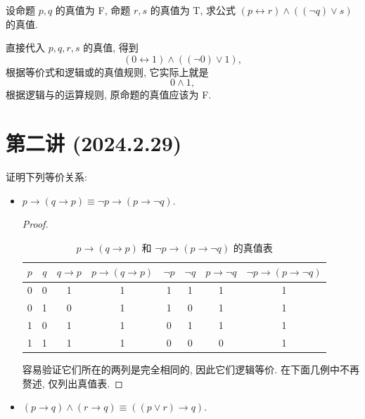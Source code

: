 \documentclass[10pt,UTF8]{book} %
\begin{document}
\begin{exercise}
    设命题 $p,q$ 的真值为 F, 命题 $r,s$ 的真值为 T, 求公式 $(p \longleftrightarrow r)
    \wedge ((\lnot q) \vee s)$ 的真值.
    \begin{sol}
        直接代入 $p,q,r,s$ 的真值, 得到
        \[ (0 \leftrightarrow 1)\wedge((\lnot 0) \vee 1), \]
        根据等价式和逻辑或的真值规则, 它实际上就是
        \[ 0 \wedge 1, \]
        根据逻辑与的运算规则, 原命题的真值应该为 F.
    \end{sol}
\end{exercise}

\section{第二讲 (2024.2.29)}

\begin{exercise}
    证明下列等价关系:
    \begin{itemize}[itemsep=0pt]
        \item $p \to (q \to p) \equiv \lnot p \to (p \to \lnot q)$.
        \begin{proof}
            \begin{table}[H]
                \centering
                \caption{$p \to (q \to p)$ 和 $\lnot p \to (p \to \lnot q)$ 的真值表}
                \begin{tabular}{cccccccc}
                    \hline
                    $p$ & $q$ & $q \to p$ & $p \to (q \to p)$ & $\lnot p$ & $\lnot q$ & $p \to \lnot q$ & $\lnot p \to (p \to \lnot q)$ \\
                    \hline
                    0 & 0 & 1 & 1 & 1 & 1 & 1 & 1 \\
                    0 & 1 & 0 & 1 & 1 & 0 & 1 & 1 \\
                    1 & 0 & 1 & 1 & 0 & 1 & 1 & 1 \\
                    1 & 1 & 1 & 1 & 0 & 0 & 0 & 1 \\
                    \hline
                \end{tabular}
            \end{table}
            容易验证它们所在的两列是完全相同的, 因此它们逻辑等价.
            在下面几例中不再赘述, 仅列出真值表.
        \end{proof}
        \item $(p \to q)\wedge(r \to q) \equiv ((p \vee r) \to q)$.
        \begin{table}[H]
            \centering
            \begin{tabular}{cccccccc}

\end{tabular}
\end{table}
\end{itemize}
\end{exercise}
\end{document}
